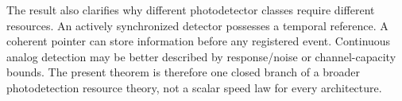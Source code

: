 \documentclass[aps,prapplied,preprint,nofootinbib]{revtex4-2}
\begin{document}
The result also clarifies why different photodetector classes require different resources. An actively synchronized detector possesses a temporal reference. A coherent pointer can store information before any registered event. Continuous analog detection may be better described by response/noise or channel-capacity bounds. The present theorem is therefore one closed branch of a broader photodetection resource theory, not a scalar speed law for every architecture.

\appendix



\end{document}
